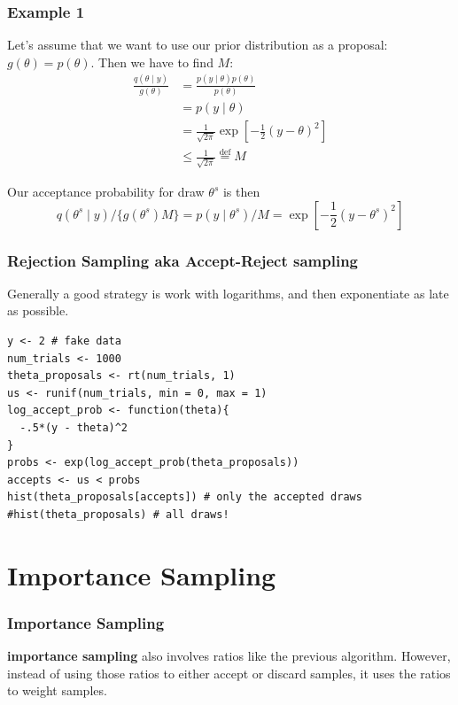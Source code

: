 \documentclass{beamer}
\begin{document}
\begin{frame}[fragile]
\frametitle{Example 1}

Let's assume that we want to use our prior distribution as a proposal: $g(\theta) = p(\theta)$. Then we have to find $M$:
\begin{align*}
\frac{q(\theta\mid y)}{g(\theta)} &= \frac{p(y \mid \theta) p(\theta)}{p(\theta)} \\
&= p(y \mid \theta) \\
&= \frac{1}{\sqrt{2\pi}} \exp\left[-\frac{1}{2} (y-\theta)^2 \right] \\
&\le \frac{1}{\sqrt{2\pi}} \overset{\text{def}}{=} M
\end{align*}

Our acceptance probability for draw $\theta^s$ is then
\[
q(\theta^s \mid y) / \{ g(\theta^s)  M\} = p(y \mid \theta^s) / M = \exp\left[-\frac{1}{2} (y-\theta^s)^2 \right]
\]


\end{frame}
\begin{frame}[fragile]
\frametitle{Rejection Sampling aka Accept-Reject sampling}

Generally a good strategy is work with logarithms, and then exponentiate as late as possible.
\begin{verbatim}
y <- 2 # fake data
num_trials <- 1000
theta_proposals <- rt(num_trials, 1)
us <- runif(num_trials, min = 0, max = 1)
log_accept_prob <- function(theta){
  -.5*(y - theta)^2
}
probs <- exp(log_accept_prob(theta_proposals))
accepts <- us < probs
hist(theta_proposals[accepts]) # only the accepted draws
#hist(theta_proposals) # all draws!
\end{verbatim}

\end{frame}

\section{Importance Sampling}
\begin{frame}[fragile]
\frametitle{Importance Sampling}

{\bf importance sampling} also involves ratios like the previous algorithm. However, instead of using those ratios to either accept or discard samples, it uses the ratios to weight samples. 
\newline


\end{frame}
\end{document}
